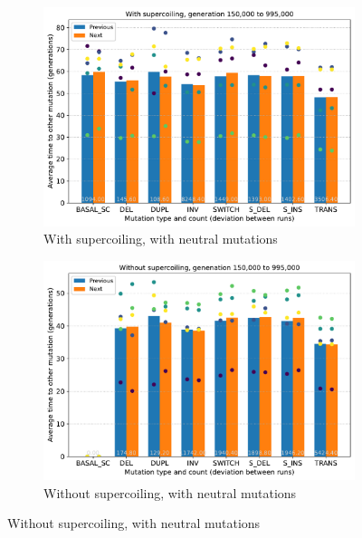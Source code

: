 \begin{figure}[h]
  \begin{subfigure}[t]{0.49\textwidth}
    \includegraphics[width=\textwidth]{aevol/images/with_sc_mut_time_150k_995k.pdf}
    \caption{With supercoiling, with neutral mutations}
    \label{subfig:sc_neut}
  \end{subfigure}
  \begin{subfigure}[t]{0.5\textwidth}
    \includegraphics[width=\textwidth]{aevol/images/without_sc_mut_time_150k_995k.pdf}
    \caption{Without supercoiling, with neutral mutations}
    \label{subfig:no_sc_neut}
  \end{subfigure}


\end{figure}

